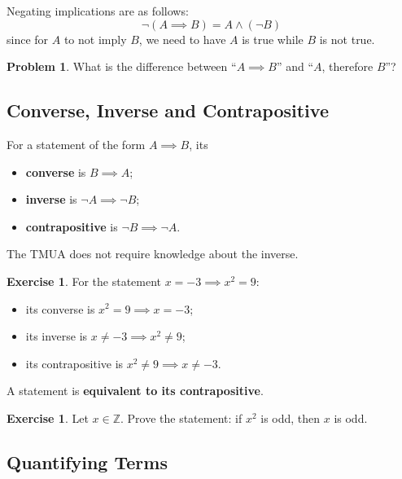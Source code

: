 \documentclass[11pt]{article}
\theoremstyle{definition}
\newtheorem{example}[theorem]{Exercise}
\newtheorem{problem}[theorem]{Problem}
\theoremstyle{remark}
\newcommand{\pqty}[1]{\left(#1\right)}
\newcommand{\ZZ}{\mathbb{Z}}
\begin{document}
Negating implications are as follows:
\[
    \lnot \pqty{A \implies B} = A \land \pqty{\lnot B}
\]
since for \(A\) to not imply \(B\), we need to have \(A\) is true while \(B\) is not true.

\begin{problem}\label{tmua-6-unit-009}
    What is the difference between ``\(A \implies B\)'' and ``\(A\), therefore \(B\)''?
\end{problem}

\subsection{Converse, Inverse and Contrapositive}\label{tmua-6-subsection-004}

For a statement of the form \(A \implies B\), its
\begin{itemize}
    \item \textbf{converse} is \(B \implies A\);
    \item \textbf{inverse} is \(\lnot A \implies \lnot B\);
    \item \textbf{contrapositive} is \(\lnot B \implies \lnot A\).
\end{itemize}

The TMUA does not require knowledge about the inverse.

\begin{example}\label{tmua-6-unit-010}
    For the statement \(x = -3 \implies x^2 = 9\):
    \begin{itemize}
        \item its converse is \(x^2 = 9 \implies x = -3\);
        \item its inverse is \(x \neq -3 \implies x^2 \neq 9\);
        \item its contrapositive is \(x^2 \neq 9 \implies x \neq -3\).
    \end{itemize}
\end{example}

A statement is \textbf{equivalent to its contrapositive}.

\begin{example}\label{tmua-6-unit-011}
    Let \(x \in \ZZ\). Prove the statement: if \(x^2\) is odd, then \(x\) is odd.
\end{example}

\subsection{Quantifying Terms}\label{tmua-6-subsection-005}
\end{document}
